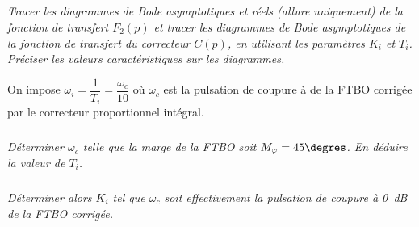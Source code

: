 \subparagraph{}
\textit{Tracer les diagrammes de Bode asymptotiques et réels (allure uniquement)
de la fonction de transfert $F_2(p)$ et tracer les diagrammes de Bode asymptotiques
de la fonction de transfert du correcteur $C(p)$, en utilisant les
paramètres $K_i$ et $T_i$. Préciser les valeurs caractéristiques sur les diagrammes.}
\ifprof
\begin{corrige}
\end{corrige}
\else
\fi

On impose $\omega_i = \dfrac{1}{T_i}=\dfrac{\omega_c}{10}$ où $\omega_c$ est la pulsation de coupure à de la
FTBO corrigée par le correcteur proportionnel intégral.

\subparagraph{}
\textit{Déterminer $\omega_c$ telle que la marge de la FTBO soit $M_{\varphi}=45\degres$. En
déduire la valeur de $T_i$.}
\ifprof
\begin{corrige}
\end{corrige}
\else
\fi



\subparagraph{}
\textit{Déterminer alors $K_i$ tel que $\omega_c$ soit effectivement la pulsation de coupure
à \SI{0}{dB} de la FTBO corrigée.}
\ifprof
\begin{corrige}
\end{corrige}
\else
\fi





\begin{center}
\end{center}

